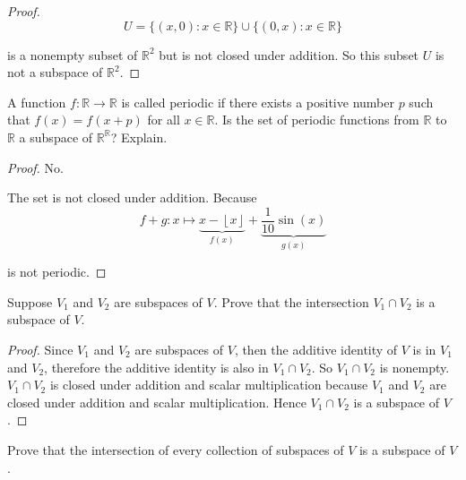 \begin{proof}
    \[
        U = \{ (x, 0): x\in\mathbb{R} \} \cup \{ (0, x): x\in\mathbb{R} \}
    \]

    is a nonempty subset of $\mathbb{R}^{2}$ but is not closed under addition. So this subset $U$ is not a subspace of $\mathbb{R}^{2}$.
\end{proof}

\begin{exercise}
    A function $f: \mathbb{R}\to\mathbb{R}$ is called periodic if there exists a positive number $p$ such that $f(x) = f(x + p)$ for all $x\in\mathbb{R}$. Is the set of periodic functions from $\mathbb{R}$ to $\mathbb{R}$ a subspace of $\mathbb{R}^{\mathbb{R}}$? Explain.
\end{exercise}

\begin{proof}
    No.

    The set is not closed under addition. Because
    \[
        f+g: x\mapsto \underbrace{x - \left\lfloor x\right\rfloor}_{f(x)} + \underbrace{\frac{1}{10}\sin(x)}_{g(x)}
    \]

    is not periodic.
\end{proof}

\begin{exercise}
    Suppose $V_{1}$ and $V_{2}$ are subspaces of $V$. Prove that the intersection $V_{1}\cap V_{2}$ is a subspace of $V$.
\end{exercise}

\begin{proof}
    Since $V_{1}$ and $V_{2}$ are subspaces of $V$, then the additive identity of $V$ is in $V_{1}$ and $V_{2}$, therefore the additive identity is also in $V_{1}\cap V_{2}$. So $V_{1}\cap V_{2}$ is nonempty. $V_{1}\cap V_{2}$ is closed under addition and scalar multiplication because $V_{1}$ and $V_{2}$ are closed under addition and scalar multiplication. Hence $V_{1}\cap V_{2}$ is a subspace of $V$.
\end{proof}

\begin{exercise}
    Prove that the intersection of every collection of subspaces of $V$ is a subspace of $V$.
\end{exercise}

